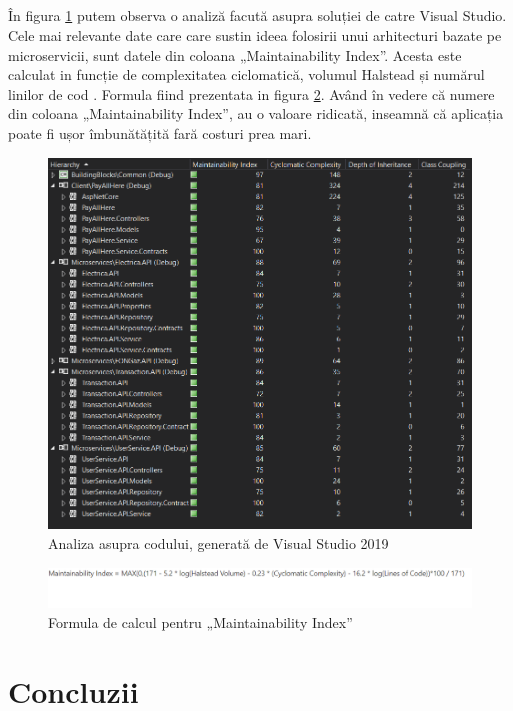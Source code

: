 \documentclass[12pt]{report}
\begin{document}
  	\paragraph{}În figura \ref{compara} putem observa o analiză facută asupra soluției de catre Visual Studio. Cele mai relevante date care care sustin ideea folosirii unui arhitecturi bazate pe microservicii, sunt datele din coloana „Maintainability Index”. Acesta este calculat in funcție de complexitatea ciclomatică, volumul Halstead și numărul linilor de cod \cite{oman1992metrics}. Formula fiind prezentata in figura \ref{formula}. Având în vedere că numere din coloana „Maintainability Index”, au o valoare ridicată, inseamnă că aplicația poate fi ușor îmbunătățită fară costuri prea mari.
  	\begin{figure}[h]
  	\centering
  	\includegraphics[scale=0.85]{comapara}
	\caption{Analiza asupra codului, generată de Visual Studio 2019}  
	\label{compara}
  	\end{figure}
  	\begin{figure}[h]
  	\centering
  	\includegraphics[scale=0.75]{formula}
	\caption{Formula de calcul pentru „Maintainability Index”}  
	\label{formula}
  	\end{figure}
\chapter{Concluzii}
\end{document}
